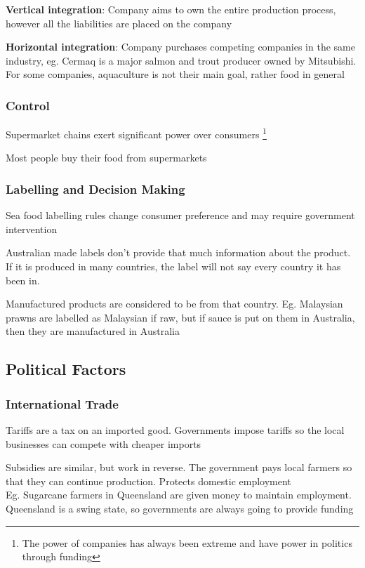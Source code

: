 				\textbf{Vertical integration}: Company aims to own the entire production process, however all the liabilities are placed on the company

				\textbf{Horizontal integration}: Company purchases competing companies in the same industry, eg. Cermaq is a major salmon and trout producer owned by Mitsubishi. For some companies, aquaculture is not their main goal, rather food in general

			\subsubsection{Control}
				 Supermarket chains exert significant power over consumers \footnote{The power of companies has always been extreme and have power in politics through funding}

				 Most people buy their food from supermarkets

			\subsubsection{Labelling and Decision Making}
				Sea food labelling rules change consumer preference and may require government intervention

				Australian made labels don't provide that much information about the product. If it is produced in many countries, the label will not say every country it has been in.

				Manufactured products are considered to be from that country. Eg. Malaysian prawns are labelled as Malaysian if raw, but if sauce is put on them in Australia, then they are manufactured in Australia

		\subsection{Political Factors}
			\subsubsection{International Trade}
				Tariffs are a tax on an imported good. Governments impose tariffs so the local businesses can compete with cheaper imports

				Subsidies are similar, but work in reverse. The government pays local farmers so that they can continue production. Protects domestic employment \\
					\; Eg. Sugarcane farmers in Queensland are given money to maintain employment. Queensland is a swing state, so governments are always going to provide funding
				
